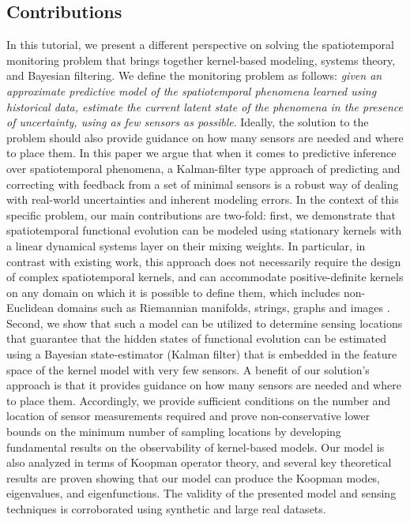 \documentclass[letterpaper,12pt,peerreviewca,draftcls]{IEEEtran}
\begin{document}
\subsection{Contributions}
In this tutorial, we present a different perspective on solving the spatiotemporal monitoring problem that brings together kernel-based modeling, systems theory, and Bayesian filtering. We define the monitoring problem as follows: \textit{given an approximate predictive model of the spatiotemporal phenomena learned using historical data, estimate the current latent state of the phenomena in the presence of uncertainty, using as few sensors as possible}. Ideally, the solution to the problem should also provide guidance on how many sensors are needed and where to place them. In this paper we argue that when it comes to predictive inference over spatiotemporal phenomena, a Kalman-filter type approach of predicting and correcting with feedback from a set of minimal sensors is a robust way of dealing with real-world uncertainties and inherent modeling errors.  In the context of this specific problem, our main contributions are two-fold: first, we demonstrate that spatiotemporal functional evolution can be modeled using stationary kernels with a linear dynamical systems layer on their mixing weights. In particular, in contrast with existing work, this approach does not necessarily require the design of complex spatiotemporal kernels, and can accommodate positive-definite kernels on any domain on which it is possible to define them, which includes non-Euclidean domains such as Riemannian manifolds, strings, graphs and images \cite{Jayasumana_PAMI2015_RBFs}. Second, we show that such a model can be utilized to determine sensing locations that guarantee that the hidden states of functional evolution can be estimated using a Bayesian state-estimator (Kalman filter) that is embedded in the feature space of the kernel model with very few sensors. A benefit of our solution's approach is that it provides guidance on how many sensors are needed and where to place them. Accordingly, we provide sufficient conditions on the number and location of sensor measurements required and prove non-conservative lower bounds on the minimum number of sampling locations by developing fundamental results on the observability of kernel-based models. Our model is also analyzed in terms of Koopman operator theory, and several key theoretical results are proven showing that our model can produce the Koopman modes, eigenvalues, and eigenfunctions. 
The validity of the presented model and sensing techniques is corroborated using synthetic and large real datasets. 
\end{document}

